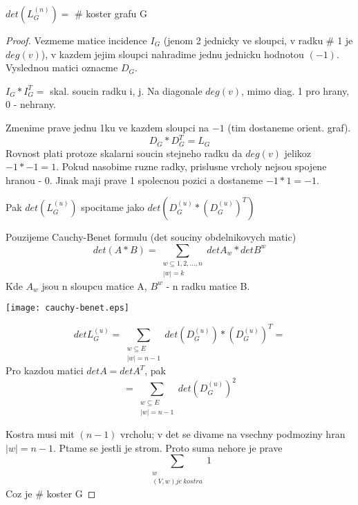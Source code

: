 \begin{theorem}
	$ det(L^{(n)}_G) = $ \# koster grafu G
\end{theorem}
\begin{proof}
	Vezmeme matice incidence $ I_G $ (jenom 2 jednicky ve sloupci, v radku \# 1 je $deg(v)$), v kazdem jejim sloupci nahradime jednu jednicku hodnotou $(-1)$. Vyslednou matici oznacme $D_G$.

	$ I_G * I_G^T = $ skal. soucin radku i, j. Na diagonale $deg(v)$, mimo diag. 1 pro hrany, 0 - nehrany.

	Zmenime prave jednu 1ku ve kazdem sloupci na $-1$ (tim dostaneme orient. graf).
	\[ D_G * D_G^T = L_G \]
	Rovnost plati protoze skalarni soucin stejneho radku da $deg(v)$ jelikoz $ -1 * -1 = 1 $. Pokud nasobime ruzne radky, prislusne vrcholy nejsou spojene hranou - 0. Jinak maji prave 1 spolecnou pozici a dostaneme $-1 * 1 = -1$.

	Pak $det(L^{(u)}_G)$ spocitame jako $det(D^{(u)}_G * (D^{(u)}_G)^T)$

	Pouzijeme Cauchy-Benet formulu (det souciny obdelnikovych matic)
	\[ det(A*B) = \sum _{\substack{ w \subseteq {1,2, ..., n} \\ |w| = k}} det A_w * det B^w \]
	Kde $ A_w $ jsou n sloupcu matice A, $ B^w $ - n radku matice B.

	\texttt{[image: cauchy-benet.eps]}

	\[ det L^{(u)}_G = \sum_{\substack{w \subseteq E \\ |w| = n-1}} det(D^{(u)}_G) * (D^{(u)}_G)^{T} = \]
	Pro kazdou matici $ det A = det A^T $, pak
	\[ = \sum_{\substack{w \subseteq E \\ |w| = n-1}} det(D^{(u)}_G)^2 \]

	Kostra musi mit $(n-1)$ vrcholu; v det se divame na vsechny podmoziny hran $|w| = n - 1$.
	Ptame se jestli je strom. Proto suma nehore je prave
	\[ \sum_{\substack{w \\ (V,w) je \ kostra}} 1 \]
	Coz je \# koster G


\end{proof}

